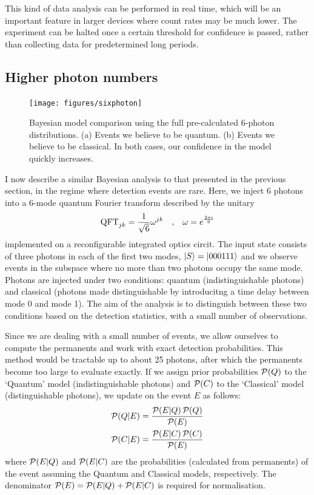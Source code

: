 This kind of data analysis can be performed in real time, which will be an
important feature in larger devices where count rates may be much lower. The
experiment can be halted once a certain threshold for confidence is passed,
rather than collecting data for predetermined long periods.

\subsection{Higher photon numbers}
\label{sec:SixPhoton}
\begin{figure}[t]
  \centering
  \texttt{[image: figures/sixphoton]}
  \caption[Bayesian model comparison on 6-photon events]
  {Bayesian model comparison using the full pre-calculated 6-photon
  distributions. (a) Events we believe to be quantum. (b) Events we believe to
  be classical. In both cases, our confidence in the model quickly increases.}
  \label{fig:sixphoton}
\end{figure}
I now describe a similar Bayesian analysis to that presented in the previous
section, in the regime where detection events are rare. Here, we inject 6
photons into a 6-mode quantum Fourier transform described by the unitary
\begin{align}
  \mathrm{QFT}_{jk} = \frac{1}{\sqrt{6}} \omega^{jk} &&,&&
  \omega=e^{\frac{2\pi i}{6}}
\end{align}
implemented on a reconfigurable integrated optics circit. The input state
consists of three photons in each of the first two modes, \(\left|S\right\rangle =
\left|000111\right\rangle\) and we observe events in the subspace where no more than two
photons occupy the same mode. Photons are injected under two conditions:
quantum (indistinguishable photons) and classical (photons made distinguishable
by introducitng a time delay between mode 0 and mode 1). The aim of the analysis
is to distinguish between these two conditions based on the detection
statistics, with a small number of observations.

Since we are dealing with a small number of events, we allow ourselves to
compute the permanents and work with exact detection probabilities. This method
would be tractable up to about 25 photons, after which the permanents become too
large to evaluate exactly. If we assign prior probabilities \(\mathcal{P} \!\left(Q\right)\)
to the `Quantum' model (indistinguishable photons) and \(\mathcal{P} \!\left(C\right)\) to
the `Classical' model (distinguishable photons), we update on the event \(E\) as
follows:
\begin{align}
  \prob{P} \of{Q \given E} &= \frac{\prob{P} \of{E \given Q} \prob{P} \of{Q}}{
    \prob{P} \of{E}} \\
  \prob{P} \of{C \given E} &= \frac{\prob{P} \of{E \given C} \prob{P} \of{C}}{
    \prob{P} \of{E}}
\end{align}
where \(\mathcal{P} \!\left(E \middle| Q\right)\) and \(\mathcal{P} \!\left(E \middle| C\right)\) are the
probabilities (calculated from permanents) of the event assuming the Quantum and
Classical models, respectively. The denominator \(\mathcal{P} \!\left(E\right) =
\mathcal{P} \!\left(E \middle| Q\right) + \mathcal{P} \!\left(E \middle| C\right)\) is required for
normalisation.

